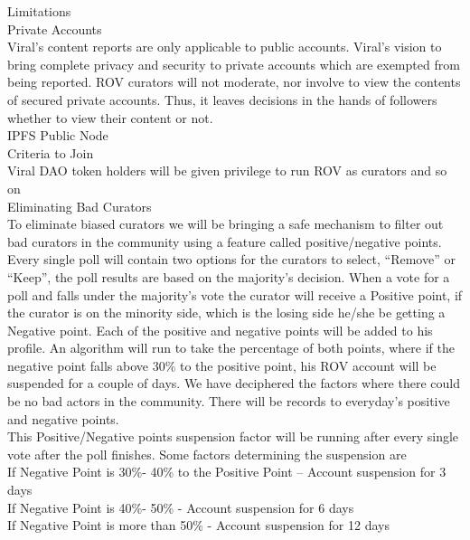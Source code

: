 \documentclass[10pt]{article}
\begin{document}
Limitations\\

Private Accounts\\

Viral’s content reports are only applicable to public accounts. Viral’s vision to bring complete privacy and security to private accounts which are exempted from being reported. ROV curators will not moderate, nor involve to view the contents of secured private accounts. Thus, it leaves decisions in the hands of followers whether to view their content or not. \\

IPFS Public Node \\

Criteria to Join\\

Viral DAO token holders will be given privilege to run ROV as curators and so on\\

Eliminating Bad Curators\\

To eliminate biased curators we will be bringing a safe mechanism to filter out bad curators in the community using a feature called positive/negative points. Every single poll will contain two options for the curators to select, “Remove” or “Keep”, the poll results are based on the majority’s decision. When a vote for a poll and falls under the majority’s vote the curator will receive a Positive point, if the curator is on the minority side, which is the losing side he/she be getting a Negative point. Each of the positive and negative points will be added to his profile. An algorithm will run to take the percentage of both points, where if the negative point falls above 30\% to the positive point, his ROV account will be suspended for a couple of days. We have deciphered the factors where there could be no bad actors in the community. There will be records to everyday's positive and negative points. \\

This Positive/Negative points suspension factor will be running after every single vote after the poll finishes. Some factors determining the suspension are\\

If Negative Point is 30\%- 40\% to the Positive Point – Account suspension for 3 days\\
If Negative Point is 40\%- 50\% - Account suspension for 6 days\\
If Negative Point is more than 50\% - Account suspension for 12 days\\
\end{document}
